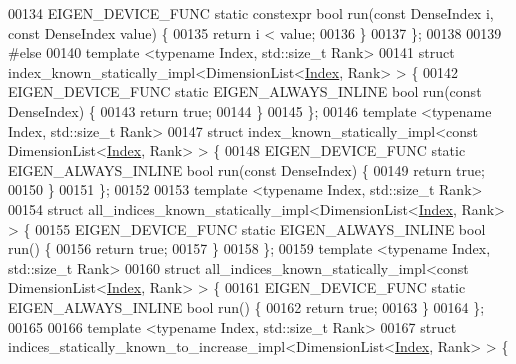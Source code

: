 \begin{DoxyCode}
00134   EIGEN\_DEVICE\_FUNC \textcolor{keyword}{static} constexpr \textcolor{keywordtype}{bool} run(\textcolor{keyword}{const} DenseIndex i, \textcolor{keyword}{const} DenseIndex value) \{
00135     \textcolor{keywordflow}{return} i < value;
00136   \}
00137 \};
00138 
00139 \textcolor{preprocessor}{#else}
00140 \textcolor{keyword}{template} <\textcolor{keyword}{typename} Index, std::\textcolor{keywordtype}{size\_t} Rank>
00141 \textcolor{keyword}{struct }index\_known\_statically\_impl<DimensionList<\hyperlink{namespace_eigen_a62e77e0933482dafde8fe197d9a2cfde}{Index}, Rank> > \{
00142   EIGEN\_DEVICE\_FUNC \textcolor{keyword}{static} EIGEN\_ALWAYS\_INLINE \textcolor{keywordtype}{bool} run(\textcolor{keyword}{const} DenseIndex) \{
00143     \textcolor{keywordflow}{return} \textcolor{keyword}{true};
00144   \}
00145 \};
00146 \textcolor{keyword}{template} <\textcolor{keyword}{typename} Index, std::\textcolor{keywordtype}{size\_t} Rank>
00147 \textcolor{keyword}{struct }index\_known\_statically\_impl<const DimensionList<\hyperlink{namespace_eigen_a62e77e0933482dafde8fe197d9a2cfde}{Index}, Rank> > \{
00148   EIGEN\_DEVICE\_FUNC \textcolor{keyword}{static} EIGEN\_ALWAYS\_INLINE \textcolor{keywordtype}{bool} run(\textcolor{keyword}{const} DenseIndex) \{
00149     \textcolor{keywordflow}{return} \textcolor{keyword}{true};
00150   \}
00151 \};
00152 
00153 \textcolor{keyword}{template} <\textcolor{keyword}{typename} Index, std::\textcolor{keywordtype}{size\_t} Rank>
00154 \textcolor{keyword}{struct }all\_indices\_known\_statically\_impl<DimensionList<\hyperlink{namespace_eigen_a62e77e0933482dafde8fe197d9a2cfde}{Index}, Rank> > \{
00155   EIGEN\_DEVICE\_FUNC \textcolor{keyword}{static} EIGEN\_ALWAYS\_INLINE \textcolor{keywordtype}{bool} run() \{
00156     \textcolor{keywordflow}{return} \textcolor{keyword}{true};
00157   \}
00158 \};
00159 \textcolor{keyword}{template} <\textcolor{keyword}{typename} Index, std::\textcolor{keywordtype}{size\_t} Rank>
00160 \textcolor{keyword}{struct }all\_indices\_known\_statically\_impl<const DimensionList<\hyperlink{namespace_eigen_a62e77e0933482dafde8fe197d9a2cfde}{Index}, Rank> > \{
00161   EIGEN\_DEVICE\_FUNC \textcolor{keyword}{static} EIGEN\_ALWAYS\_INLINE \textcolor{keywordtype}{bool} run() \{
00162     \textcolor{keywordflow}{return} \textcolor{keyword}{true};
00163   \}
00164 \};
00165 
00166 \textcolor{keyword}{template} <\textcolor{keyword}{typename} Index, std::\textcolor{keywordtype}{size\_t} Rank>
00167 \textcolor{keyword}{struct }indices\_statically\_known\_to\_increase\_impl<DimensionList<\hyperlink{namespace_eigen_a62e77e0933482dafde8fe197d9a2cfde}{Index}, Rank> > \{

\end{DoxyCode}

